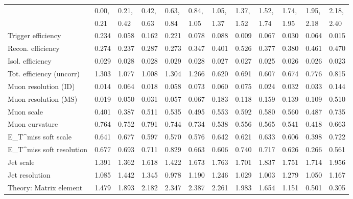 \begin{tabular}{l|p{0.6cm}p{0.6cm}p{0.6cm}p{0.6cm}p{0.6cm}p{0.6cm}p{0.6cm}p{0.6cm}p{0.6cm}p{0.6cm}p{0.6cm}}
\hline
   & 0.00, & 0.21, & 0.42, & 0.63, & 0.84, & 1.05, & 1.37, & 1.52, & 1.74, & 1.95, & 2.18,  \\ 
   & 0.21 & 0.42 & 0.63 & 0.84 & 1.05 & 1.37 & 1.52 & 1.74 & 1.95 & 2.18 & 2.40  \\ 
\hline
Trigger efficiency                       & 0.234 & 0.058 & 0.162 & 0.221 & 0.078 & 0.088 & 0.009 & 0.067 & 0.030 & 0.064 & 0.015 \\
Recon. efficiency                        & 0.274 & 0.237 & 0.287 & 0.273 & 0.347 & 0.401 & 0.526 & 0.377 & 0.380 & 0.461 & 0.470 \\
Isol. efficiency                         & 0.029 & 0.028 & 0.028 & 0.029 & 0.028 & 0.027 & 0.027 & 0.025 & 0.026 & 0.026 & 0.023 \\
Tot. efficiency (uncorr)                 & 1.303 & 1.077 & 1.008 & 1.304 & 1.266 & 0.620 & 0.691 & 0.607 & 0.674 & 0.776 & 0.815 \\
Muon resolution (ID)                     & 0.014 & 0.064 & 0.018 & 0.058 & 0.073 & 0.060 & 0.075 & 0.024 & 0.032 & 0.033 & 0.144 \\
Muon resolution (MS)                     & 0.019 & 0.050 & 0.031 & 0.057 & 0.067 & 0.183 & 0.118 & 0.159 & 0.139 & 0.109 & 0.510 \\
Muon scale                               & 0.401 & 0.387 & 0.511 & 0.535 & 0.495 & 0.553 & 0.592 & 0.580 & 0.560 & 0.487 & 0.735 \\
Muon curvature                           & 0.764 & 0.752 & 0.791 & 0.744 & 0.734 & 0.538 & 0.556 & 0.565 & 0.541 & 0.418 & 0.663 \\
E_{T}^{miss} soft scale                  & 0.641 & 0.677 & 0.597 & 0.570 & 0.576 & 0.642 & 0.621 & 0.633 & 0.606 & 0.398 & 0.722 \\
E_{T}^{miss} soft resolution             & 0.677 & 0.693 & 0.711 & 0.829 & 0.663 & 0.606 & 0.740 & 0.717 & 0.626 & 0.266 & 0.561 \\
Jet scale                                & 1.391 & 1.362 & 1.618 & 1.422 & 1.673 & 1.763 & 1.701 & 1.837 & 1.751 & 1.714 & 1.956 \\
Jet resolution                           & 1.085 & 1.442 & 1.345 & 0.978 & 1.190 & 1.246 & 1.029 & 1.003 & 1.279 & 1.050 & 1.167 \\
Theory: Matrix element                   & 1.479 & 1.893 & 2.182 & 2.347 & 2.387 & 2.261 & 1.983 & 1.654 & 1.151 & 0.501 & 0.305 \\

\end{tabular}
